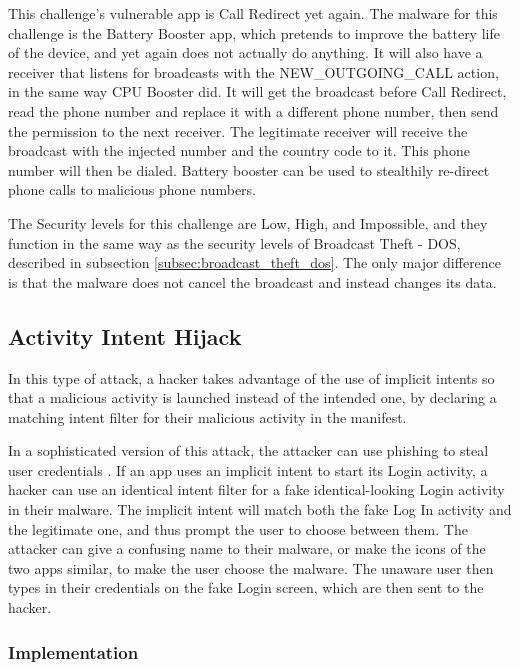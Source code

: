     This challenge's vulnerable app is Call Redirect yet again. The malware for this challenge is the Battery Booster app, which pretends to improve the battery life of the device, and yet again does not actually do anything. It will also have a receiver that listens for broadcasts with the NEW\_OUTGOING\_CALL action, in the same way CPU Booster did. It will get the broadcast before Call Redirect, read the phone number and replace it with a different phone number, then send the permission to the next receiver. The legitimate receiver will receive the broadcast with the injected number and the country code to it. This phone number will then be dialed. Battery booster can be used to stealthily re-direct phone calls to malicious phone numbers.
        
    The Security levels for this challenge are Low, High, and Impossible, and they function in the same way as the security levels of Broadcast Theft - DOS, described in subsection \ref{subsec:broadcast_theft_dos}. The only major difference is that the malware does not cancel the broadcast and instead changes its data.
    
    \subsection{Activity Intent Hijack}
        \label{subsec:activity_hijacking}
        
    In this type of attack, a hacker takes advantage of the use of implicit intents so that a malicious activity is launched instead of the intended one, by declaring a matching intent filter for their malicious activity in the manifest.
    
    In a sophisticated version of this attack, the attacker can use phishing to steal user credentials \cite{2010_icc_paper}. If an app uses an implicit intent to start its Login activity, a hacker can use an identical intent filter for a fake identical-looking Login activity in their malware. The implicit intent will match both the fake Log In activity and the legitimate one, and thus prompt the user to choose between them. The attacker can give a confusing name to their malware, or make the icons of the two apps similar, to make the user choose the malware. The unaware user then types in their credentials on the fake Login screen, which are then sent to the hacker.
    
    \subsubsection{Implementation}
        \label{subsubsec:activity_hijack_implementation}
        
